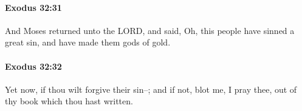 		\paragraph{Exodus 32:31} %
			\label{EXODUS-32-31}

			And Moses returned unto the LORD, and said, Oh, this people have sinned a great sin, and have made them gods of gold.


		\paragraph{Exodus 32:32} %
			\label{EXODUS-32-32}

			Yet now, if thou wilt forgive their sin--; and if not, blot me, I pray thee, out of thy book which thou hast written.


